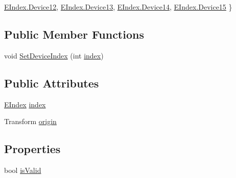 \begin{DoxyCompactItemize}
\mbox{\hyperlink{class_valve_1_1_v_r_1_1_steam_v_r___tracked_object_a3d437894eff0bfc81eeb21a8c478413eac2623c9a04f34c5ab8c78c520e411ed2}{E\+Index.\+Device12}}, 
\mbox{\hyperlink{class_valve_1_1_v_r_1_1_steam_v_r___tracked_object_a3d437894eff0bfc81eeb21a8c478413ea891659f1e1dfeb1429550e9df36924d9}{E\+Index.\+Device13}}, 
\mbox{\hyperlink{class_valve_1_1_v_r_1_1_steam_v_r___tracked_object_a3d437894eff0bfc81eeb21a8c478413ea1402fcf96ab460400dfc692298707039}{E\+Index.\+Device14}}, 
\newline
\mbox{\hyperlink{class_valve_1_1_v_r_1_1_steam_v_r___tracked_object_a3d437894eff0bfc81eeb21a8c478413ea4460f362ad1991aab6de8cc043688767}{E\+Index.\+Device15}}
 \}
\end{DoxyCompactItemize}
\subsection*{Public Member Functions}
\begin{DoxyCompactItemize}
\item 
void \mbox{\hyperlink{class_valve_1_1_v_r_1_1_steam_v_r___tracked_object_a8021e93fa573edf951b71fb758243d8e}{Set\+Device\+Index}} (int \mbox{\hyperlink{class_valve_1_1_v_r_1_1_steam_v_r___tracked_object_a2a5ca7a8565885adf0cfa2449603f57a}{index}})
\end{DoxyCompactItemize}
\subsection*{Public Attributes}
\begin{DoxyCompactItemize}
\item 
\mbox{\hyperlink{class_valve_1_1_v_r_1_1_steam_v_r___tracked_object_a3d437894eff0bfc81eeb21a8c478413e}{E\+Index}} \mbox{\hyperlink{class_valve_1_1_v_r_1_1_steam_v_r___tracked_object_a2a5ca7a8565885adf0cfa2449603f57a}{index}}
\item 
Transform \mbox{\hyperlink{class_valve_1_1_v_r_1_1_steam_v_r___tracked_object_a2dd40fde31add6c17a4614bda2de241c}{origin}}
\end{DoxyCompactItemize}
\subsection*{Properties}
\begin{DoxyCompactItemize}
\item 
bool \mbox{\hyperlink{class_valve_1_1_v_r_1_1_steam_v_r___tracked_object_aff86155d6bd6cc055201e3be599f3c0e}{is\+Valid}}
\end{DoxyCompactItemize}


